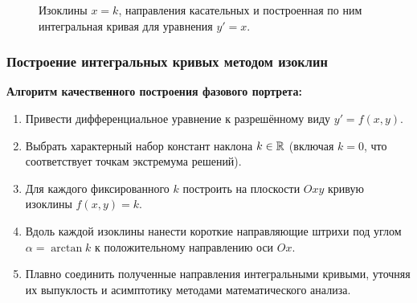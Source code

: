 \begin{figure}[H]
    \centering
    \caption{Изоклины $x = k$, направления касательных и построенная по ним
    интегральная кривая для уравнения $y' = x$.}
\end{figure}

\subsubsection{Построение интегральных кривых методом изоклин}

\textbf{Алгоритм качественного построения фазового портрета:}
\begin{enumerate}
    \item Привести дифференциальное уравнение к разрешённому виду
    $y' = f(x, y)$.
    \item Выбрать характерный набор констант наклона $k \in \mathbb{R}$ (включая
    $k = 0$, что соответствует точкам экстремума решений).
    \item Для каждого фиксированного $k$ построить на плоскости $Oxy$ кривую
    изоклины $f(x, y) = k$.
    \item Вдоль каждой изоклины нанести короткие направляющие штрихи под
    углом $\alpha = \arctan k$ к положительному направлению оси $Ox$.
    \item Плавно соединить полученные направления интегральными кривыми,
    уточняя их выпуклость и асимптотику методами математического анализа.
\end{enumerate}